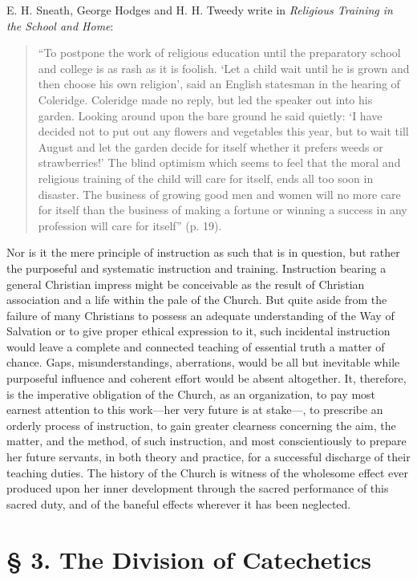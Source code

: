 E. H. Sneath, George Hodges and H. H. Tweedy write in \emph{Religious Training in the School and Home}:
\begin{quote}
“To postpone the work of religious education until the preparatory school and college is as rash as it is foolish. ‘Let a child wait until he is grown and then choose his own religion’, said an English statesman in the hearing of Coleridge. Coleridge made no reply, but led the speaker out into his garden. Looking around upon the bare ground he said quietly: ‘I have decided not to put out any flowers and vegetables this year, but to wait till August and let the garden decide for itself whether it prefers weeds or strawberries!’ The blind optimism which seems to feel that the moral and religious training of the child will care for itself, ends all too soon in disaster. The business of growing good men and women will no more care for itself than the business of making a fortune or winning a success in any profession will care for itself” (p. 19).
\end{quote}

Nor is it the mere principle of instruction as such that is in question, but rather the purposeful and systematic instruction and training. Instruction bearing a general Christian impress might be conceivable as the result of Christian association and a life within the pale of the Church. But
quite aside from the failure of many Christians to possess an adequate understanding of the Way of Salvation or to give proper ethical expression to it, such incidental instruction would leave a complete and connected teaching of essential truth a matter of chance. Gaps, misunderstandings, aberrations, would be all but inevitable while purposeful influence and coherent effort would be absent altogether. It, therefore, is the imperative obligation of the Church, as an organization, to pay most earnest attention to this work—her very future is at stake—, to prescribe an orderly process of instruction, to gain greater clearness concerning the aim, the matter, and the method, of such instruction, and most conscientiously to prepare her future servants, in both theory and practice, for a successful discharge of their teaching duties. The history of the Church is witness of the wholesome effect ever produced upon her inner development through the sacred performance of this sacred duty, and of the baneful effects wherever it has been neglected.

\section{§ 3. The Division of Catechetics}

